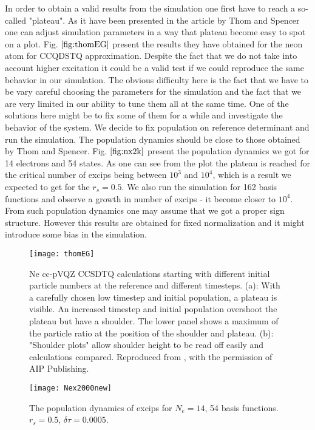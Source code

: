 \documentclass[twoside,english]{uiofysmaster}
\theoremstyle{definition}
\begin{document}
In order to obtain a valid results from the simulation one first have to reach a so-called "plateau". As it have been presented in the article by Thom and Spencer \cite{spencerDevelopmentsStochasticCoupled2016} one can adjust simulation parameters in a way that plateau become easy to spot on a plot. Fig. $\ref{fig:thomEG}$ present the results they have obtained for the neon atom for CCQDSTQ approximation. Despite the fact that we do not take into account higher excitation it could be a valid test if we could reproduce the same behavior in our simulation. The obvious difficulty here is the fact that we have to be vary careful choosing the parameters for the simulation and the fact that we are very limited in our ability to tune them all at the same time. One of the solutions here might be to fix some of them for a while and investigate the behavior of the system. We decide to fix population on reference determinant and run the simulation. The population dynamics should be close to those obtained by Thom and Spencer. Fig. $\ref{fig:nx2k}$ present the population dynamics we got for 14 electrons and 54 states. As one can see from the plot the plateau is reached for the critical number of excips being between $10^3$ and $10^4$, which is a result we expected to get for the $r_s=0.5$. We also run the simulation for 162 basis functions and observe a growth in number of excips - it become closer to $10^4$. From such population dynamics one may assume that we got a proper sign structure. However this results are obtained for fixed normalization and it might introduce some bias in the simulation. 





\begin{figure}[ht!]
	\centering
	\texttt{[image: thomEG]}
	\caption{Ne cc-pVQZ CCSDTQ calculations starting with different initial
		particle numbers at the reference and different timesteps. (a): With a carefully
		chosen low timestep and initial population, a plateau is visible. An increased
		timestep and initial population overshoot the plateau but have a shoulder.
		The lower panel shows a maximum of the particle ratio at the position of
		the shoulder and plateau. (b): "Shoulder plots" allow shoulder height to be
		read off easily and calculations compared. Reproduced from \cite{spencerDevelopmentsStochasticCoupled2016}, with the permission of AIP Publishing. }
	\label{fig:thomEG}
\end{figure}


\begin{figure}[ht!]
	\centering
	\texttt{[image: Nex2000new]}
	\caption{The population dynamics of excips for $N_e=14$, 54 basis functions. $r_s=0.5$, $\delta \tau=0.0005$.}
	\label{fig:nx2k}
\end{figure}
\end{document}
